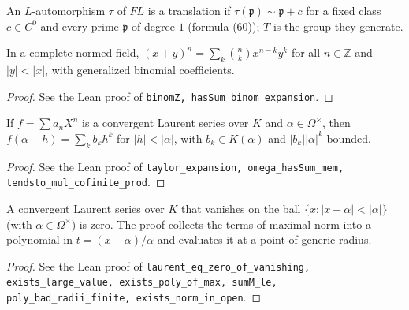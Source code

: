\begin{definition}
\label{def:translation-group}
\leanok
An $L$-automorphism $\tau$ of $FL$ is a translation if $\tau(\mathfrak p)\sim\mathfrak p+c$ for a fixed class $c\in C^0$ and every prime $\mathfrak p$ of degree $1$ (formula (60)); $T$ is the group they generate.
\end{definition}

\begin{lemma}
\label{lem:binomial-expansion}
\leanok
In a complete normed field, $(x+y)^n=\sum_k\binom nk x^{n-k}y^k$ for all $n\in\mathbb Z$ and $|y|<|x|$, with generalized binomial coefficients.
\end{lemma}
\begin{proof}
\leanok
See the Lean proof of \texttt{binomZ, hasSum\_binom\_expansion}.
\end{proof}

\begin{proposition}
\label{prop:taylor-expansion}
\leanok
If $f=\sum a_nX^n$ is a convergent Laurent series over $K$ and $\alpha\in\Omega^\times$, then $f(\alpha+h)=\sum_k b_kh^k$ for $|h|<|\alpha|$, with $b_k\in K(\alpha)$ and $|b_k||\alpha|^k$ bounded.
\end{proposition}
\begin{proof}
\leanok
See the Lean proof of \texttt{taylor\_expansion, omega\_hasSum\_mem, tendsto\_mul\_cofinite\_prod}.
\end{proof}

\begin{lemma}
\label{lem:identity-theorem}
\leanok
A convergent Laurent series over $K$ that vanishes on the ball $\{x : |x-\alpha|<|\alpha|\}$ (with $\alpha\in\Omega^\times$) is zero. The proof collects the terms of maximal norm into a polynomial in $t=(x-\alpha)/\alpha$ and evaluates it at a point of generic radius.
\end{lemma}
\begin{proof}
\leanok
See the Lean proof of \texttt{laurent\_eq\_zero\_of\_vanishing, exists\_large\_value, exists\_poly\_of\_max, sumM\_le, poly\_bad\_radii\_finite, exists\_norm\_in\_open}.
\end{proof}

